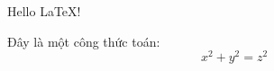\documentclass{article}
\begin{document}
Hello LaTeX!

Đây là một công thức toán:
\[
  x^2 + y^2 = z^2
\]
\end{document}
